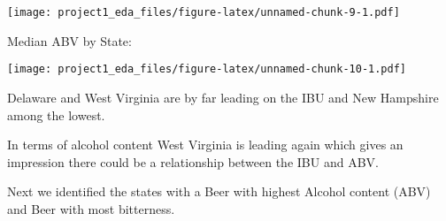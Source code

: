 \documentclass[]{article}
\newenvironment{Shaded}{\begin{snugshade}}{\end{snugshade}}
\newcommand{\CommentTok}[1]{\textcolor[rgb]{0.56,0.35,0.01}{\textit{#1}}}
\newcommand{\DataTypeTok}[1]{\textcolor[rgb]{0.13,0.29,0.53}{#1}}
\newcommand{\DecValTok}[1]{\textcolor[rgb]{0.00,0.00,0.81}{#1}}
\newcommand{\FloatTok}[1]{\textcolor[rgb]{0.00,0.00,0.81}{#1}}
\newcommand{\KeywordTok}[1]{\textcolor[rgb]{0.13,0.29,0.53}{\textbf{#1}}}
\newcommand{\NormalTok}[1]{#1}
\newcommand{\OperatorTok}[1]{\textcolor[rgb]{0.81,0.36,0.00}{\textbf{#1}}}
\newcommand{\StringTok}[1]{\textcolor[rgb]{0.31,0.60,0.02}{#1}}
\begin{document}
\texttt{[image: project1\_eda\_files/figure-latex/unnamed-chunk-9-1.pdf]}

Median ABV by State:

\begin{Shaded}
\end{Shaded}

\texttt{[image: project1\_eda\_files/figure-latex/unnamed-chunk-10-1.pdf]}

Delaware and West Virginia are by far leading on the IBU and New
Hampshire among the lowest.

In terms of alcohol content West Virginia is leading again which gives
an impression there could be a relationship between the IBU and ABV.

Next we identified the states with a Beer with highest Alcohol content
(ABV) and Beer with most bitterness.

\begin{Shaded}
\end{Shaded}
\end{document}
